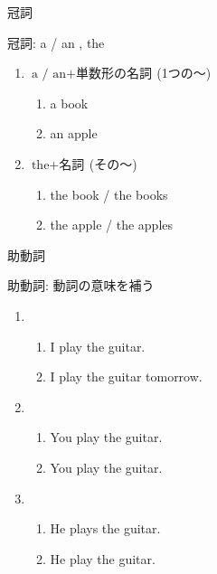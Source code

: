 \documentclass[aspectratio=169,xcolor={dvipsnames,table}]{beamer}
\begin{document}
\begin{frame}[plain]{冠詞}
\Large

冠詞: a / an , the

 \begin{enumerate}
  \item $\text{a / an} + \text{単数形の名詞}$\,(1つの～)
	\begin{enumerate}
	 \item a book\hfill\textipa{/\textschwa /}
	 \item an apple\hfill{}
	\end{enumerate}
  \item $\text{the} + \text{名詞}$\,(その～)\hspace{10pt}{\small (単数形・複数形どちらにもつく)}
	\begin{enumerate}
	 \item the book / the books\hfill\textipa{/\dh\textschwa/}
	 \item the apple / the apples\hfill{}
	\end{enumerate}
 \end{enumerate}
\mbox{}\hfill{\scriptsize {}}
\end{frame}
\begin{frame}[plain]{助動詞}
 \Large

助動詞: 動詞の意味を補う

\begin{enumerate}
 \item \begin{enumerate}
	\item I play the guitar.
	\item I  play the guitar tomorrow.
       \end{enumerate}
 \item \begin{enumerate}
	\item You play the guitar.
	\item You  play the guitar.
       \end{enumerate}
 \item \begin{enumerate}
	\item He plays the guitar.
	\item He  play the guitar.
       \end{enumerate}
\end{enumerate}
\mbox{}\hfill{\scriptsize {}}
\end{frame}
\end{document}

